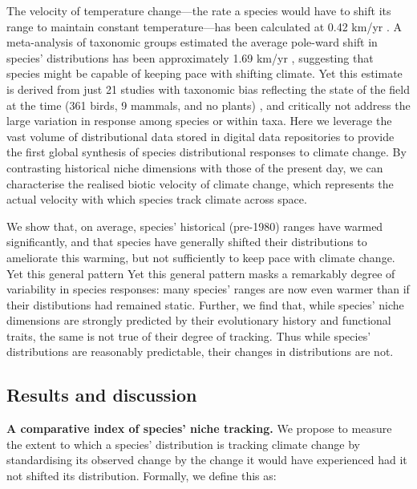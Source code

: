 \documentclass[12pt]{report}
\begin{document}
The velocity of
temperature change---the rate a species would have to shift its range
to maintain constant temperature---has been calculated at 0.42 km/yr
\supercite{Loarie2009}. A meta-analysis of taxonomic groups estimated
the average pole-ward shift in species' distributions has been
approximately 1.69 km/yr \supercite{Chen2011},
suggesting that species might be capable of keeping pace with shifting
climate.
Yet this estimate is derived from just 21 studies with taxonomic bias
reflecting the state of the field at the time (361 birds, 9 mammals,
and no plants)
, and critically not address the large variation in response among
species or within taxa. Here we leverage the vast volume of
distributional data stored in digital data
repositories\supercite{url_gbif} to provide the first global synthesis
of species distributional responses to climate change. By contrasting
historical niche dimensions with those of the present day, we can
characterise the realised biotic velocity of climate change, which
represents the actual velocity with which species track climate across
space.

We show that, on average, species' historical (pre-1980) ranges have
warmed significantly, and that species have generally shifted their
distributions to ameliorate this warming, but not sufficiently to keep
pace with climate change. Yet this general pattern Yet this general
pattern masks a remarkably degree of variability in species responses:
many species' ranges are now even warmer than if their distibutions
had remained static. Further, we find that, while species' niche
dimensions are strongly predicted by their evolutionary history and
functional traits, the same is not true of their degree of
tracking. Thus while species' distributions are reasonably
predictable, their changes in distributions are not.

\clearpage
\subsection*{Results and discussion}
\textbf{A comparative index of species' niche tracking.} We propose to
measure the extent to which a species' distribution is tracking
climate change by standardising its observed change by the change it
would have experienced had it not shifted its distribution. Formally,
we define this as:
\end{document}
